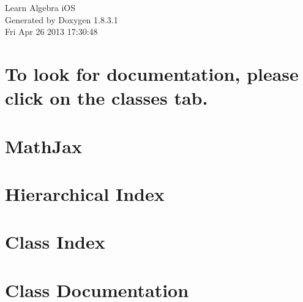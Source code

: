 \documentclass{book}
\begin{document}
\hypersetup{pageanchor=false,citecolor=blue}
\begin{titlepage}
\vspace*{7cm}
\begin{center}
{\Large Learn Algebra i\-O\-S }\\
\vspace*{1cm}
{\large Generated by Doxygen 1.8.3.1}\\
\vspace*{0.5cm}
{\small Fri Apr 26 2013 17:30:48}\\
\end{center}
\end{titlepage}
\clearemptydoublepage
{}
\tableofcontents
\clearemptydoublepage
{}
\hypersetup{pageanchor=true,citecolor=blue}
\chapter{To look for documentation, please click on the classes tab.}
\label{index}\hypertarget{index}{}
\chapter{Math\-Jax}
\label{md_README}
\hypertarget{md_README}{}

\chapter{Hierarchical Index}

\chapter{Class Index}

\chapter{Class Documentation}

























\printindex
\end{document}
